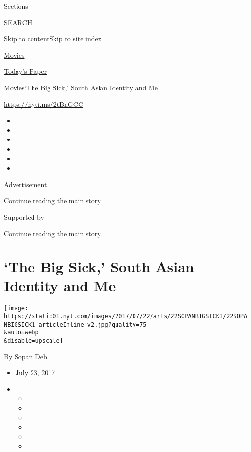 Sections

SEARCH

\protect\hyperlink{site-content}{Skip to
content}\protect\hyperlink{site-index}{Skip to site index}

\href{https://www.nytimes.com/section/movies}{Movies}

\href{https://myaccount.nytimes.com/auth/login?response_type=cookie\&client_id=vi}{}

\href{https://www.nytimes.com/section/todayspaper}{Today's Paper}

\href{/section/movies}{Movies}\textbar{}`The Big Sick,' South Asian
Identity and Me

\href{https://nyti.ms/2tBnGCC}{https://nyti.ms/2tBnGCC}

\begin{itemize}
\item
\item
\item
\item
\item
\item
\end{itemize}

Advertisement

\protect\hyperlink{after-top}{Continue reading the main story}

Supported by

\protect\hyperlink{after-sponsor}{Continue reading the main story}

\hypertarget{the-big-sick-south-asian-identity-and-me}{%
\section{`The Big Sick,' South Asian Identity and
Me}\label{the-big-sick-south-asian-identity-and-me}}

\texttt{[image: https://static01.nyt.com/images/2017/07/22/arts/22SOPANBIGSICK1/22SOPANBIGSICK1-articleInline-v2.jpg?quality=75\\\&auto=webp\\\&disable=upscale]}

By \href{https://www.nytimes.com/by/sopan-deb}{Sopan Deb}

\begin{itemize}
\item
  July 23, 2017
\item
  \begin{itemize}
  \item
  \item
  \item
  \item
  \item
  \item
  \end{itemize}
\end{itemize}

